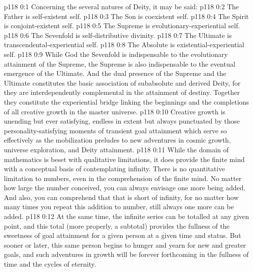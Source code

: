 \author{Mighty Messenger}
\vs p118 0:1 Concerning the several natures of Deity, it may be said:
\vs p118 0:2 \bibnobreakspace The Father is self\hyp{}existent self.
\vs p118 0:3 \bibnobreakspace The Son is coexistent self.
\vs p118 0:4 \bibnobreakspace The Spirit is conjoint\hyp{}existent self.
\vs p118 0:5 \bibnobreakspace The Supreme is evolutionary\hyp{}experiential self.
\vs p118 0:6 \bibnobreakspace The Sevenfold is self\hyp{}distributive divinity.
\vs p118 0:7 \bibnobreakspace The Ultimate is transcendental\hyp{}experiential self.
\vs p118 0:8 \bibnobreakspace The Absolute is existential\hyp{}experiential self.
\vs p118 0:9 \pc While God the Sevenfold is indispensable to the evolutionary attainment of the Supreme, the Supreme is also indispensable to the eventual emergence of the Ultimate. And the dual presence of the Supreme and the Ultimate constitutes the basic association of subabsolute and derived Deity, for they are interdependently complemental in the attainment of destiny. Together they constitute the experiential bridge linking the beginnings and the completions of all creative growth in the master universe.
\vs p118 0:10 \pc Creative growth is unending but ever satisfying, endless in extent but always punctuated by those personality\hyp{}satisfying moments of transient goal attainment which serve so effectively as the mobilization preludes to new adventures in cosmic growth, universe exploration, and Deity attainment.
\vs p118 0:11 While the domain of mathematics is beset with qualitative limitations, it does provide the finite mind with a conceptual basis of contemplating infinity. There is no quantitative limitation to numbers, even in the comprehension of the finite mind. No matter how large the number conceived, you can always envisage one more being added. And also, you can comprehend that that is short of infinity, for no matter how many times you repeat this addition to number, still always one more can be added.
\vs p118 0:12 At the same time, the infinite series can be totalled at any given point, and this total (more properly, a subtotal) provides the fullness of the sweetness of goal attainment for a given person at a given time and status. But sooner or later, this same person begins to hunger and yearn for new and greater goals, and such adventures in growth will be forever forthcoming in the fullness of time and the cycles of eternity.
